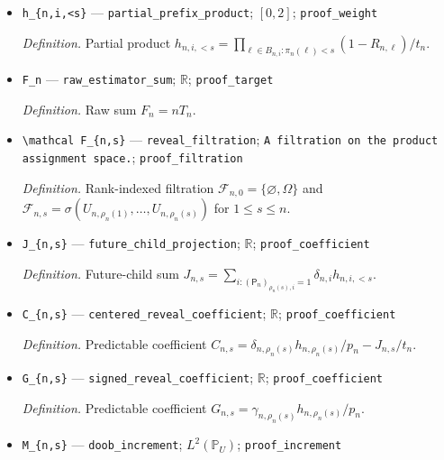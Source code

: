 \documentclass{article}
\begin{document}
\begin{itemize}
  \par\smallskip\noindent\emph{Definition.} Product \(h_{n,i}=\prod_{\ell\in B_{n,i}}(1-R_{n,\ell})/t_n\).
  \item \texttt{h\_\allowbreak{}\{n,\allowbreak{}i,\allowbreak{}<s\}\allowbreak{}} --- \texttt{partial\_\allowbreak{}prefix\_\allowbreak{}product}; \([0,2]\); \texttt{proof\_\allowbreak{}weight}
  \par\smallskip\noindent\emph{Definition.} Partial product \(h_{n,i,<s}=\prod_{\ell\in B_{n,i}:\pi_n(\ell)<s}(1-R_{n,\ell})/t_n\).
  \item \texttt{F\_\allowbreak{}n} --- \texttt{raw\_\allowbreak{}estimator\_\allowbreak{}sum}; \(\mathbb R\); \texttt{proof\_\allowbreak{}target}
  \par\smallskip\noindent\emph{Definition.} Raw sum \(F_n=nT_n\).
  \item \texttt{\textbackslash{}\allowbreak{}mathcal F\_\allowbreak{}\{n,\allowbreak{}s\}\allowbreak{}} --- \texttt{reveal\_\allowbreak{}filtration}; \texttt{A filtration on the product assignment space.}; \texttt{proof\_\allowbreak{}filtration}
  \par\smallskip\noindent\emph{Definition.} Rank-indexed filtration \(\mathcal F_{n,0}=\{\varnothing,\Omega\}\) and \(\mathcal F_{n,s}=\sigma(U_{n,\rho_n(1)},\ldots,U_{n,\rho_n(s)})\) for \(1\le s\le n\).
  \item \texttt{J\_\allowbreak{}\{n,\allowbreak{}s\}\allowbreak{}} --- \texttt{future\_\allowbreak{}child\_\allowbreak{}projection}; \(\mathbb R\); \texttt{proof\_\allowbreak{}coefficient}
  \par\smallskip\noindent\emph{Definition.} Future-child sum \(J_{n,s}=\sum_{i:(\mathsf P_n)_{\rho_n(s),i}=1}\delta_{n,i}h_{n,i,<s}\).
  \item \texttt{C\_\allowbreak{}\{n,\allowbreak{}s\}\allowbreak{}} --- \texttt{centered\_\allowbreak{}reveal\_\allowbreak{}coefficient}; \(\mathbb R\); \texttt{proof\_\allowbreak{}coefficient}
  \par\smallskip\noindent\emph{Definition.} Predictable coefficient \(C_{n,s}=\delta_{n,\rho_n(s)}h_{n,\rho_n(s)}/p_n-J_{n,s}/t_n\).
  \item \texttt{G\_\allowbreak{}\{n,\allowbreak{}s\}\allowbreak{}} --- \texttt{signed\_\allowbreak{}reveal\_\allowbreak{}coefficient}; \(\mathbb R\); \texttt{proof\_\allowbreak{}coefficient}
  \par\smallskip\noindent\emph{Definition.} Predictable coefficient \(G_{n,s}=\gamma_{n,\rho_n(s)}h_{n,\rho_n(s)}/p_n\).
  \item \texttt{M\_\allowbreak{}\{n,\allowbreak{}s\}\allowbreak{}} --- \texttt{doob\_\allowbreak{}increment}; \(L^2(\mathbb P_U)\); \texttt{proof\_\allowbreak{}increment}

\end{itemize}
\end{document}

